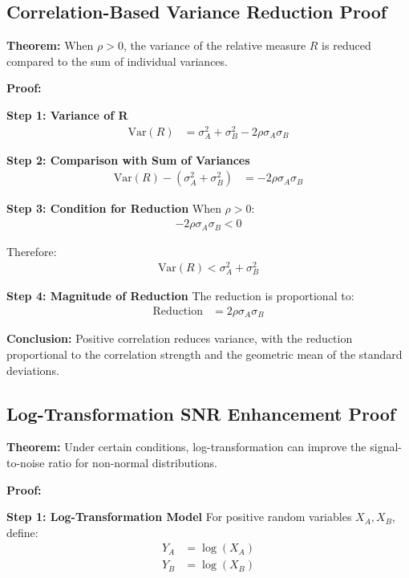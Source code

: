 \subsection{Correlation-Based Variance Reduction Proof}

\textbf{Theorem:} When $\rho > 0$, the variance of the relative measure $R$ is reduced compared to the sum of individual variances.

\textbf{Proof:}

\textbf{Step 1: Variance of R}
\begin{align}
\text{Var}(R) &= \sigma_A^2 + \sigma_B^2 - 2\rho\sigma_A\sigma_B
\end{align}

\textbf{Step 2: Comparison with Sum of Variances}
\begin{align}
\text{Var}(R) - (\sigma_A^2 + \sigma_B^2) &= -2\rho\sigma_A\sigma_B
\end{align}

\textbf{Step 3: Condition for Reduction}
When $\rho > 0$:
\begin{align}
-2\rho\sigma_A\sigma_B < 0
\end{align}

Therefore:
\begin{align}
\text{Var}(R) < \sigma_A^2 + \sigma_B^2
\end{align}

\textbf{Step 4: Magnitude of Reduction}
The reduction is proportional to:
\begin{align}
\text{Reduction} &= 2\rho\sigma_A\sigma_B
\end{align}

\textbf{Conclusion:} Positive correlation reduces variance, with the reduction proportional to the correlation strength and the geometric mean of the standard deviations.

\subsection{Log-Transformation SNR Enhancement Proof}

\textbf{Theorem:} Under certain conditions, log-transformation can improve the signal-to-noise ratio for non-normal distributions.

\textbf{Proof:}

\textbf{Step 1: Log-Transformation Model}
For positive random variables $X_A, X_B$, define:
\begin{align}
Y_A &= \log(X_A) \\
Y_B &= \log(X_B)
\end{align}

